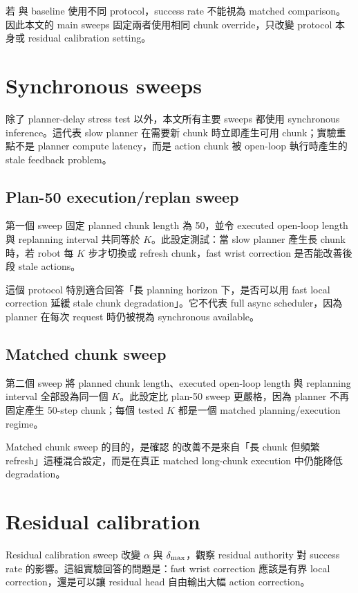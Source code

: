 若 \method{} 與 \smolvla{} baseline 使用不同 protocol，success rate 不能視為 matched comparison。因此本文的 main sweeps 固定兩者使用相同 chunk override，只改變 protocol 本身或 residual calibration setting。

\section{Synchronous sweeps}

除了 planner-delay stress test 以外，本文所有主要 sweeps 都使用 synchronous inference。這代表 slow planner 在需要新 chunk 時立即產生可用 chunk；實驗重點不是 planner compute latency，而是 action chunk 被 open-loop 執行時產生的 stale feedback problem。

\subsection{Plan-50 execution/replan sweep}

第一個 sweep 固定 planned chunk length 為 50，並令 executed open-loop length 與 replanning interval 共同等於 $K$。此設定測試：當 slow planner 產生長 chunk 時，若 robot 每 $K$ 步才切換或 refresh chunk，fast wrist correction 是否能改善後段 stale actions。

這個 protocol 特別適合回答「長 planning horizon 下，是否可以用 fast local correction 延緩 stale chunk degradation」。它不代表 full async scheduler，因為 planner 在每次 request 時仍被視為 synchronous available。

\subsection{Matched chunk sweep}

第二個 sweep 將 planned chunk length、executed open-loop length 與 replanning interval 全部設為同一個 $K$。此設定比 plan-50 sweep 更嚴格，因為 planner 不再固定產生 50-step chunk；每個 tested $K$ 都是一個 matched planning/execution regime。

Matched chunk sweep 的目的，是確認 \method{} 的改善不是來自「長 chunk 但頻繁 refresh」這種混合設定，而是在真正 matched long-chunk execution 中仍能降低 degradation。

\section{Residual calibration}

Residual calibration sweep 改變 $\alpha$ 與 $\delta_{\max}$，觀察 residual authority 對 success rate 的影響。這組實驗回答的問題是：fast wrist correction 應該是有界 local correction，還是可以讓 residual head 自由輸出大幅 action correction。

